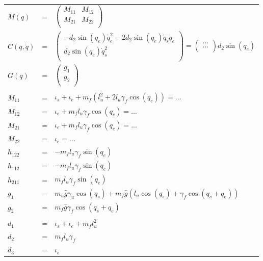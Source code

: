 \documentclass[pdftex,a4paper,11pt]{article}
\numberwithin{equation}{subsection}
\begin{document}
\paragraph{}
\begin{tabular}{lcl}
    $M(q)$ & = &
    $
    \begin{pmatrix}
        M_{11} & M_{12} \\
        M_{21} & M_{22} \\
    \end{pmatrix}
    $ \\

    $C(q, \dot{q})$ & = &
    $
    \begin{pmatrix}
        -d_2 \sin(q_e) \dot{q}_e^2 - 2 d_2 \sin(q_e)\dot{q}_s\dot{q}_e \\
        d_2 \sin(q_e) \dot{q}_s^2 \\
    \end{pmatrix} =
    \begin{pmatrix}
        ... \\
        ... \\
    \end{pmatrix}
    d_2 \sin(q_e)
    $\\

    $G(q)$ & = &
    $
    \begin{pmatrix}
        g_1 \\
        g_2 \\
    \end{pmatrix}
    $ \\
    \\

    $M_{11}$ & = & $\iota_s + \iota_e + m_f(l_u^2 + 2 l_u \gamma_f \cos(q_e)) = ...$ \\
    $M_{12}$ & = & $\iota_e + m_f l_u \gamma_f \cos(q_e) = ...$ \\
    $M_{21}$ & = & $\iota_e + m_f l_u \gamma_f \cos(q_e) = ...$ \\
    $M_{22}$ & = & $\iota_e = ...$ \\
    $h_{122}$ & = & $-m_f l_u \gamma_f \sin(q_e)$ \\
    $h_{112}$ & = & $-m_f l_u \gamma_f \sin(q_e)$ \\
    $h_{211}$ & = & $m_f l_u  \gamma_f \sin(q_e)$ \\
    $g_1$ & = & $m_u \hat{g}  \gamma_u \cos(q_s) + m_f \hat{g} (l_u \cos(q_s) + \gamma_f \cos(q_s + q_e))$ \\
    $g_2$ & = & $m_f \hat{g}  \gamma_f \cos(q_s + q_e)$ \\
    \\

    $d_1$ & = & $\iota_s + \iota_e + m_f l_u^2$ \\
    $d_2$ & = & $m_f l_u \gamma_f$ \\
    $d_3$ & = & $\iota_e$ \\
\end{tabular}
\end{document}

